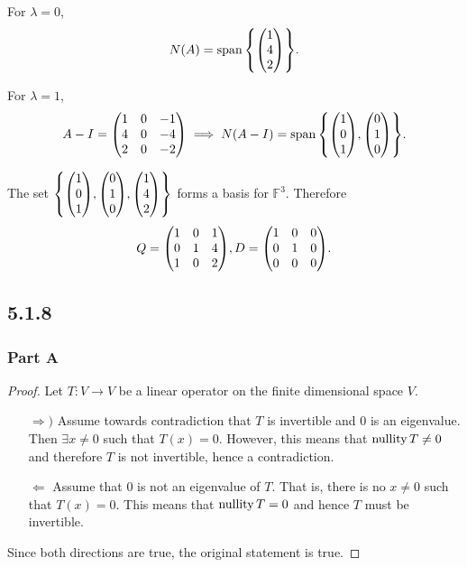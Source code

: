 \documentclass[12pt,titlepage]{extarticle}
\begin{document}
For $\lambda = 0$,
\[
    N(A) = \spann\qty{\mqty(1 \\ 4 \\ 2)}
.\]

For $\lambda = 1$,
\[
    A - I = \mqty(
        1 & 0 & -1 \\
        4 & 0 & -4 \\
        2 & 0 & -2 \\
    ) \implies N(A - I) = \spann\qty{
        \mqty(1 \\ 0 \\ 1),
        \mqty(0 \\ 1 \\ 0)
    }
.\]

The set $\qty{
    \mqty(1 \\ 0 \\ 1),
    \mqty(0 \\ 1 \\ 0),
    \mqty(1 \\ 4 \\ 2)
}$ forms a basis for $\mathbb{F}^3$. Therefore
\[
    Q = \mqty(
    1 & 0 & 1 \\
    0 & 1 & 4 \\
    1 & 0 & 2 \\
    ), D = \mqty(\dmat[0]{1,1,0})
.\]

\subsection*{5.1.8}
\subsubsection*{Part A}
\begin{proof}
    Let $T : V \to V$ be a linear operator on the finite dimensional space $V$.
    \begin{enumerate}
        \item[$\Rightarrow)$] 
            Assume towards contradiction that $T$ is invertible and $0$ is an eigenvalue. Then $\exists x \neq 0$ such that $T(x) = 0$. However, this means that $\operatorname{nullity} T \neq 0$ and therefore $T$ is not invertible, hence a contradiction.
        \item[$\Leftarrow$]
            Assume that $0$ is not an eigenvalue of $T$. That is, there is no $x \neq 0$ such that $T(x) = 0$. This means that $\operatorname{nullity} T = 0$ and hence $T$ must be invertible.
    \end{enumerate}
    Since both directions are true, the original statement is true.
\end{proof}
\end{document}
